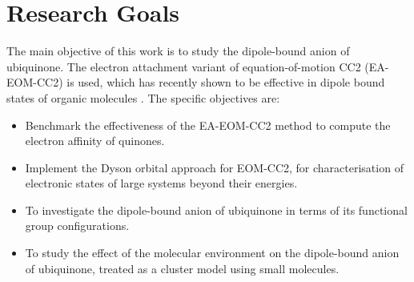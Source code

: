 \section{Research Goals}
The main objective of this work is to study the dipole-bound anion of ubiquinone. The electron attachment variant of equation-of-motion CC2 (EA-EOM-CC2) is used, which has recently shown to be effective in dipole bound states of organic molecules \cite{paran2024performance}. The specific objectives are:
\begin{itemize}
  \item Benchmark the effectiveness of the EA-EOM-CC2 method to compute the electron affinity of quinones.
  \item Implement the Dyson orbital approach for EOM-CC2, for characterisation of electronic states of large systems beyond their energies.
  \item To investigate the dipole-bound anion of ubiquinone in terms of its functional group configurations.
  \item To study the effect of the molecular environment on the dipole-bound anion of ubiquinone, treated as a cluster model using small molecules.
\end{itemize}

\cleardoublepage

